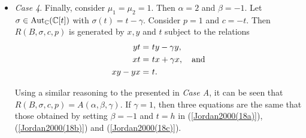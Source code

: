 \documentclass{amsart}
\theoremstyle{definition}
\theoremstyle{remark}
\numberwithin{equation}{section}
\begin{document}
\begin{itemize}
Let $\sigma\in {\rm Aut}_{\mathbb{C}}(\mathbb{C}[t])$ defined by $\sigma(t) = \mu^{-1}t$, Consider 
$$
p = \mu^{-1} \quad {\rm and} \quad c = -\mu^{-1} \left(t + \frac{\mu^2 \gamma}{1 - \mu}\right).
$$

The defining equations for $R(B, \sigma, c, p)$ are
\begin{align}
\mu yt = &\ ty,  \label{Jordan2000(20a)} \\
xt = &\ \mu tx, \quad {\rm and} \label{Jordan2000(20b)} \\
xy - \mu yx = &\ t + \frac{\mu^2 \gamma}{1 - \mu}.
\end{align}

If we compare with {\em Case A}, then we get that $\mu_1 = \mu_2 = \mu$, so that $R(B, \sigma, c, p) = A(\alpha, \beta, \gamma)$.

Since for $a\in \mathbb{C}[t]$, $\sigma(a) - pa$ has zero coefficient of $t$, $(\mathbb{C}[t], \sigma, , c, p)$ is not conformal. By Proposition \ref{Jordan2000Proposition2.1},
$$
A(\alpha, \beta, \gamma) \cong \mathbb{C}[t, \omega] (\sigma, \omega) \ {\rm with} \ \ \sigma(t) = \mu^{-1}t \ \ {\rm and} \ \ \sigma(\omega) = \mu^{-1} \left(\omega - \mu^{-1}t - \frac{\mu^2 \gamma}{1 - \mu} \right).
$$

With the aim of showing that $\sigma$ is conjugate to a triangular automorphism of type (c), let $h = \omega - \frac{\mu^2 \gamma}{(1 - \mu)^2}$. Then $\mathbb{C}[t, \omega] = \mathbb{C}[t, h]$ and
\begin{equation}
A(\alpha, \beta, \gamma) \cong \mathbb{C}[t, h](\sigma, \omega) \quad {\rm where} \, \, \sigma(t) = \mu^{-1}t \ \ {\rm and} \ \  \sigma(h) = \mu^{-1}(h - \mu^{-1}t).
\end{equation}

\item {\em Case 4}. Finally, consider $\mu_1 = \mu_2 = 1$. Then $\alpha = 2$ and $\beta = -1$. Let $\sigma\in {\rm Aut}_{\mathbb{C}}(\mathbb{C}[t])$ with $\sigma(t) = t - \gamma$. Consider $p = 1$ and $c = -t$. Then $R(B, \sigma, c, p)$ is generated by $x, y$ and $t$ subject to the relations 
\begin{align}
yt = &\ ty - \gamma y, \\
xt = &\ tx + \gamma x, \quad {\rm and} \\
xy - yx = &\ t.
\end{align}

Using a similar reasoning to the presented in {\em Case A}, it can be seen that $R(B, \sigma, c, p) = A(\alpha, \beta, \gamma)$. If $\gamma = 1$, then three equations are the same that those obtained by setting $\beta = -1$ and $t = h$ in (\ref{Jordan2000(18a)}), (\ref{Jordan2000(18b)}) and (\ref{Jordan2000(18c)}).


\end{itemize}
\end{document}
